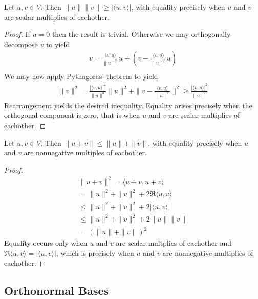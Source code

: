 \documentclass[]{article}
\begin{document}
\begin{thm} 

	Let $u,v \in V$. Then $\|u\|\|v\| \geq |\langle u, v \rangle |$, with equality precisely when $u$ and $v$ are scalar multiplies of eachother.
		
\end{thm}

\begin{proof}
		If $u = 0$ then the result is trivial. Otherwise we may orthogonally decompose $v$ to yield
		\begin{align*}
				v = \frac{\langle v, u \rangle }{\|u\|^2} u + (v - \frac{\langle v, u \rangle }{\|u\|^2}u) \\
		\end{align*}
		We may now apply Pythagoras' theorem to yield
		\begin{align*}
				\|v\|^2 = \frac{|\langle v, u \rangle |^2}{\|u\|^{4}} \|u\|^2 + \|v - \frac{\langle v, u \rangle }{\|u\|^2}\|^2
				\geq \frac{|\langle v, u \rangle |^2}{\|u\|^2}
		\end{align*}
		Rearrangement yields the desired inequality. Equality arises precisely when the orthogonal component is zero, that is when $u$ and $v$ are scalar multiplies of eachother.
\end{proof}

\begin{thm} 
	Let $u,v \in V$. Then $\|u+v\| \leq \|u\| + \|v\|$, with equality precisely when $u$ and $v$ are nonnegative multiples of eachother.	
\end{thm}

\begin{proof}
	 \begin{align*}
			\|u+v\|^2 = \langle u+v, u+v \rangle \\
			= \|u\|^2 + \|v\|^2 + 2\Re \langle u, v \rangle  \\
			\leq \|u\|^2 + \|v\|^2 + 2|\langle u, v \rangle | \\
			\leq \|u\|^2 + \|v\|^2 + 2\|u\|\|v\| \\
			= (\|u\| + \|v\|)^2
	\end{align*}	
	Equality occurs only when $u$ and $v$ are scalar multplies of eachother and $\Re \langle u, v \rangle = |\langle u, v \rangle |$, which is precisely when $u $ and $v$ are nonnegative multiplies of eachother.
\end{proof}

\subsection{Orthonormal Bases}
\end{document}
